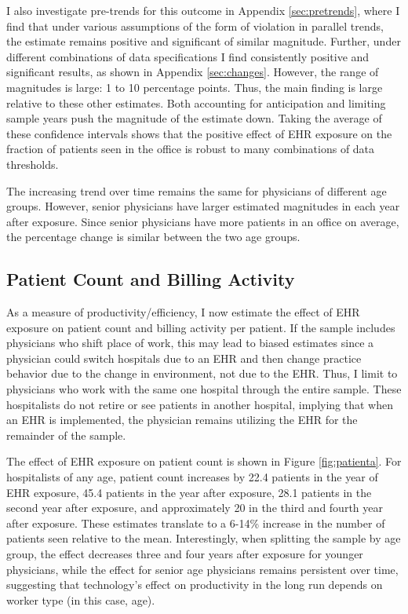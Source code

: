 \documentclass[12pt]{article}
\begin{document}
I also investigate pre-trends for this outcome in Appendix \ref{sec:pretrends}, where I find that under various assumptions of the form of violation in parallel trends, the estimate remains positive and significant of similar magnitude. Further, under different combinations of data specifications I find consistently positive and significant results, as shown in Appendix \ref{sec:changes}. However, the range of magnitudes is large: 1 to 10 percentage points. Thus, the main finding is large relative to these other estimates. Both accounting for anticipation and limiting sample years push the magnitude of the estimate down. Taking the average of these confidence intervals shows that the positive effect of EHR exposure on the fraction of patients seen in the office is robust to many combinations of data thresholds. 

The increasing trend over time remains the same for physicians of different age groups. However, senior physicians have larger estimated magnitudes in each year after exposure. Since senior physicians have more patients in an office on average, the percentage change is similar between the two age groups. 



\subsection{Patient Count and Billing Activity}\label{sec:patientcount}

As a measure of productivity/efficiency, I now estimate the effect of EHR exposure on patient count and billing activity per patient. If the sample includes physicians who shift place of work, this may lead to biased estimates since a physician could switch hospitals due to an EHR and then change practice behavior due to the change in environment, not due to the EHR. Thus, I limit to physicians who work with the same one hospital through the entire sample. These hospitalists do not retire or see patients in another hospital, implying that when an EHR is implemented, the physician remains utilizing the EHR for the remainder of the sample. 

The effect of EHR exposure on patient count is shown in Figure \ref{fig:patienta}. For hospitalists of any age, patient count increases by 22.4 patients in the year of EHR exposure, 45.4 patients in the year after exposure, 28.1 patients in the second year after exposure, and approximately 20 in the third and fourth year after exposure. These estimates translate to a 6-14\% increase in the number of patients seen relative to the mean. Interestingly, when splitting the sample by age group, the effect decreases three and four years after exposure for younger physicians, while the effect for senior age physicians remains persistent over time, suggesting that technology's effect on productivity in the long run depends on worker type (in this case, age). 
\end{document}
